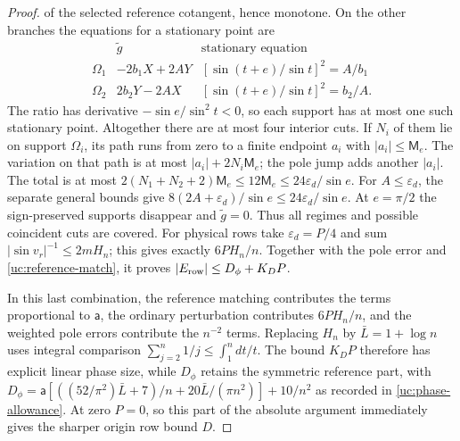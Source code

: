 \begin{proof}
of the selected reference cotangent, hence monotone. On the other
branches the equations for a stationary point are
\[
\begin{array}{ccc}
 &\tilde g&\text{stationary equation}\\ \hline
 \Omega_1&-2b_1X+2AY&[\sin(t+e)/\sin t]^2=A/b_1\\
 \Omega_2&2b_2Y-2AX&[\sin(t+e)/\sin t]^2=b_2/A.
\end{array}
\]
The ratio has derivative $-\sin e/\sin^2t<0$, so each support has
at most one such stationary point. Altogether there are at most four
interior cuts. If $N_i$ of them lie on support $\Omega_i$, its path runs
from zero to a finite endpoint $a_i$ with $|a_i|\leq \mathsf{M}_e$. The
variation on that path is at most $|a_i|+2N_i\mathsf{M}_e$; the pole jump
adds another $|a_i|$. The total is at most
$2(N_1+N_2+2)\mathsf{M}_e\leq12\mathsf{M}_e\leq24\varepsilon_d/\sin e$.
For $A\leq\varepsilon_d$, the separate general bounds give
$8(2A+\varepsilon_d)/\sin e\leq24\varepsilon_d/\sin e$.
At $e=\pi/2$ the sign-preserved supports disappear and $\tilde g=0$.
Thus all regimes and possible coincident cuts are covered. For physical rows take
$\varepsilon_d=P/4$ and sum $|\sin v_r|^{-1}\leq2mH_n$;
this gives exactly $6PH_n/n$. Together with the pole error and
\eqref{uc:reference-match}, it proves
$|E_{\rm row}|\leq D_\phi+K_DP$.

In this last combination, the reference matching contributes the
terms proportional to $\mathsf{a}$, the ordinary perturbation contributes
$6PH_n/n$, and the weighted pole errors contribute the $n^{-2}$
terms. Replacing $H_n$ by $\bar{L}=1+\log n$ uses integral comparison
$\sum_{j=2}^n1/j\leq\int_1^n dt/t$. The bound $K_DP$ therefore
has explicit linear phase size, while $D_\phi$ retains the symmetric
reference part, with
$D_\phi=\mathsf a[((52/\pi^2)\bar L+7)/n+20\bar L/(\pi n^2)]+10/n^2$
as recorded in \eqref{uc:phase-allowance}. At zero $P=0$, so this part of the absolute argument
immediately gives the sharper origin row bound $D$.


\end{proof}
